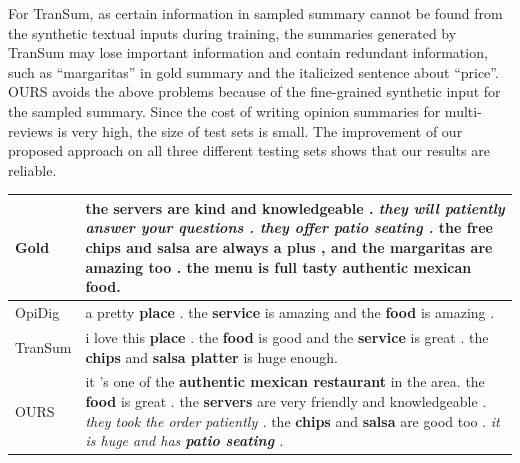 For TranSum, as certain information in sampled summary cannot be found from the synthetic textual inputs during training, the summaries generated by TranSum may lose important information and contain redundant information, such as ``margaritas'' in gold summary and
the italicized sentence about ``price''.
OURS avoids the above problems because of the fine-grained 
synthetic input for the sampled summary.
Since the cost of writing opinion summaries for multi-reviews is very high, 
the size of test sets is small. The improvement of our proposed approach on all three different testing sets shows that our results are reliable. 

\begin{table}[th]
	\begin{center}
		\scriptsize
		\begin{tabular}{|p{0.75cm}|m{6cm}|}	
			\hline
			Gold & 
			the \textbf{servers} are kind and knowledgeable . \textit{they will
				patiently answer your questions . they offer \textbf{patio seating} .}
			the free \textbf{chips} and \textbf{salsa} are always a plus , and the \textbf{margaritas} are \textbf{amazing} too . the menu is full tasty \textbf{authentic mexican food.} \\
			\hline
			\hline
			OpiDig & a pretty \textbf{place} . the \textbf{service} is amazing and the \textbf{food} is amazing . 
			\color{red}{\textbf{atmosphere} is great and the \textbf{portions} are huge}
			\\
			\hline
			TranSum& i love this \textbf{place} . the \textbf{food} is good and the \textbf{service} is great . the \textbf{chips} and \textbf{salsa platter} is huge enough. 
			\textit{\color{red}{the only thing is that it 's a little pricey for what you get .}}
			\\
			\hline
			\hline
			OURS & it 's one of the \textbf{authentic mexican restaurant} in the area. the \textbf{food} is great . the \textbf{servers} are very friendly and knowledgeable . \textit{they took the order patiently .} the \textbf{chips} and \textbf{salsa} are good too . \textit{it is huge and has \textbf{patio seating} . } 
			\\
			\hline
		\end{tabular}
	\end{center}
	

\end{table}
